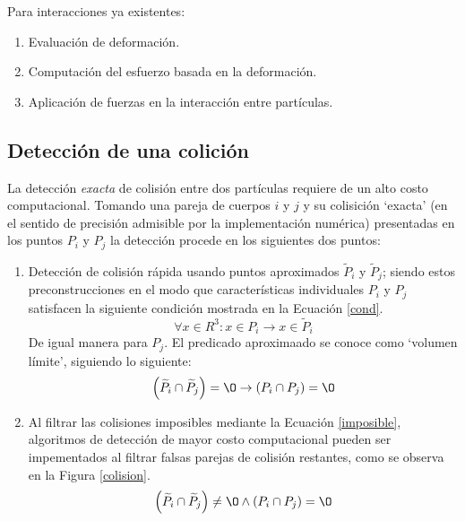 \noindent
\justify

Para interacciones ya existentes:

\begin{enumerate}
	\item Evaluaci\'on de deformaci\'on.
	\item Computaci\'on del esfuerzo basada en la deformaci\'on.
	\item Aplicaci\'on de fuerzas en la interacci\'on entre part\'iculas.
\end{enumerate}

\subsection{Detecci\'on de una colici\'on}

\noindent
\justify

La detecci\'on \textit{exacta} de colisi\'on entre dos part\'iculas requiere de un alto costo computacional. Tomando una pareja de cuerpos $i$ y $j$ y su colisici\'on `exacta' (en el sentido de precisi\'on admisible por la implementaci\'on num\'erica) presentadas en los puntos $P_i$ y $P_j$ la detecci\'on procede en los siguientes dos puntos:

\begin{enumerate}
	\item Detecci\'on de colisi\'on r\'apida usando puntos aproximados $\widetilde{P}_i$ y $\widetilde{P}_j$; siendo estos preconstrucciones en el modo que caracter\'isticas individuales $P_i$ y $P_j$ satisfacen la siguiente condici\'on mostrada en la Ecuaci\'on \ref{cond}.
	\begin{equation}
		\forall x \in R^3 : x \in P_i \rightarrow x \in \widetilde{P}_i
		\label{cond}
	\end{equation}
	De igual manera para $P_j$. El predicado aproximaado se conoce como `volumen l\'imite', siguiendo lo siguiente:
	\begin{equation}
		\left(\widetilde{P}_i \cap \widetilde{P}_j \right) = {\O} \rightarrow \left( P_i \cap P_j \right) = {\O}
		\label{imposible}
	\end{equation}
	\item Al filtrar las colisiones imposibles mediante la Ecuaci\'on \ref{imposible}, algoritmos de detecci\'on de mayor costo computacional pueden ser impementados al filtrar falsas parejas de colisi\'on restantes, como se observa en la Figura \ref{colision}.
	\begin{equation}
		\left(\widetilde{P}_i \cap \widetilde{P}_j \right) \neq {\O} \wedge \left(P_i \cap P_j \right) = {\O}
	\end{equation}
\end{enumerate}

